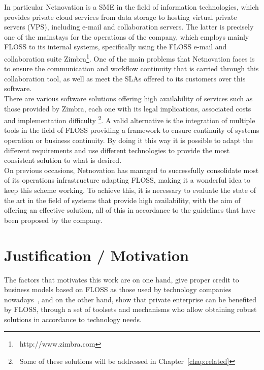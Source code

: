 \documentclass[a4paper, 12pt]{book}
\begin{document}
\noindent In particular Netnovation is a SME in the field of information technologies, which provides private cloud services from data storage to hosting virtual private servers (VPS), including e-mail and collaboration servers. The latter is precisely one of the mainstays for the operations of the company, which employs mainly FLOSS to its internal systems, specifically using the FLOSS e-mail and collaboration suite Zimbra\texttrademark \footnote{\ http://www.zimbra.com}. One of the main problems that Netnovation faces is to ensure the communication and workflow continuity that is carried through this collaboration tool, as well as meet the SLAs offered to its customers over this software.\\

\noindent There are various software solutions offering high availability of services such as those provided by Zimbra, each one with its legal implications, associated costs and implementation difficulty \footnote{\ Some of these solutions will be addressed in Chapter~\ref{chap:related}}. A valid alternative is the integration of multiple tools in the field of FLOSS providing a framework to ensure  continuity of systems operation or business continuity. By doing it this way it is possible to adapt the different requirements and use different technologies to provide the most consistent solution to what is desired.\\

\noindent On previous occasions, Netnovation has managed to successfully consolidate most of its operations infrastructure adapting FLOSS, making it a wonderful idea to keep this scheme working. To achieve this, it is necessary to evaluate the state of the art in the field of systems that provide high availability, with the aim of offering an effective solution, all of this in accordance to the guidelines that have been proposed by the company.



\section{Justification / Motivation}
\label{sec:justification}


The factors that motivates this work are on one hand, give proper credit to business models based on FLOSS as those used by technology companies nowadays~\cite{Daffara2}, and on the other hand, show that private enterprise can be benefited by FLOSS, through a set of toolsets and mechanisms who allow obtaining robust solutions in accordance to technology needs.
\end{document}
